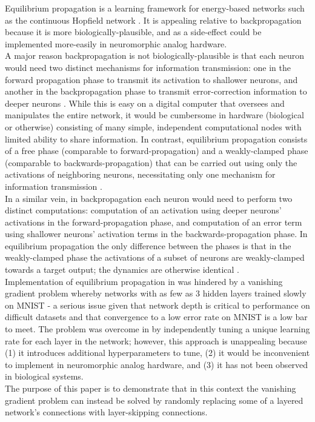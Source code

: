 \documentclass[format=sigconf]{acmart}
\newcommand{\npar}{\\\indent}
\begin{document}
Equilibrium propagation \cite{scellier17} is a learning framework for energy-based networks such as the continuous Hopfield network \cite{hopfield1984}. It is appealing relative to backpropagation because it is more biologically-plausible, and as a side-effect could be implemented more-easily in neuromorphic analog hardware.
\npar
A major reason backpropagation is not biologically-plausible is that each neuron would need two distinct mechanisms for information transmission: one in the forward propagation phase to transmit its activation to shallower neurons, and another in the backpropagation phase to transmit error-correction information to deeper neurons \cite{bengio2015}. While this is easy on a digital computer that oversees and manipulates the entire network, it would be cumbersome in hardware (biological or otherwise) consisting of many simple, independent computational nodes with limited ability to share information. In contrast, equilibrium propagation consists of a free phase (comparable to forward-propagation) and a weakly-clamped phase (comparable to backwards-propagation) that can be carried out using only the activations of neighboring neurons, necessitating only one mechanism for information transmission \cite{scellier17}.
\npar
In a similar vein, in backpropagation each neuron would need to perform two distinct computations: computation of an activation using deeper neurons' activations in the forward-propagation phase, and computation of an error term using shallower neurons' activation terms in the backwards-propagation phase. In equilibrium propagation the only difference between the phases is that in the weakly-clamped phase the activations of a subset of neurons are weakly-clamped towards a target output; the dynamics are otherwise identical \cite{scellier17}.
\npar
Implementation of equilibrium propagation in \cite{scellier17} was hindered by a vanishing gradient problem whereby networks with as few as 3 hidden layers trained slowly on MNIST \cite{mnist1998} - a serious issue given that network depth is critical to performance on difficult datasets \cite{simonyan2014, srivastava2015tvdn} and that convergence to a low error rate on MNIST is a low bar to meet. The problem was overcome in \cite{scellier17} by independently tuning a unique learning rate for each layer in the network; however, this approach is unappealing because (1) it introduces additional hyperparameters to tune, (2) it would be inconvenient to implement in neuromorphic analog hardware, and (3) it has not been observed in biological systems.
\npar
The purpose of this paper is to demonstrate that in this context the vanishing gradient problem can instead be solved by randomly replacing some of a layered network's connections with layer-skipping connections.
\end{document}
